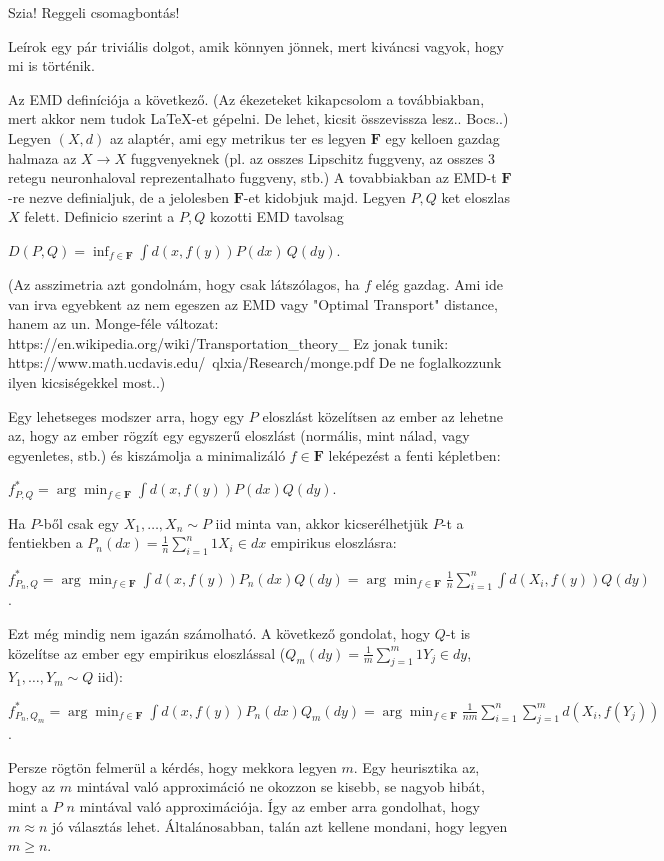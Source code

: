 \documentclass[a4paper]{article}
\newcommand{\cF}{\mathbf{F}}
\newcommand{\one}{1}
\begin{document}
Szia!
Reggeli csomagbontás!

Leírok egy pár triviális dolgot, amik könnyen jönnek, mert kiváncsi vagyok, hogy mi is történik.

Az EMD definíciója a következő. (Az ékezeteket kikapcsolom a továbbiakban, mert akkor nem tudok LaTeX-et gépelni. De lehet, kicsit összevissza lesz.. Bocs..)
Legyen $(X,d)$ az alaptér, ami egy metrikus ter es legyen $\cF$ egy kelloen gazdag halmaza az $X\to X$ fuggvenyeknek (pl. az osszes Lipschitz fuggveny, az osszes 3 retegu neuronhaloval reprezentalhato fuggveny, stb.)
A tovabbiakban az EMD-t $\cF$-re nezve definialjuk, de a jelolesben $\cF$-et kidobjuk majd.
Legyen $P,Q$ ket eloszlas $X$ felett. Definicio szerint a $P,Q$ kozotti EMD tavolsag

$D(P,Q) = \inf_{f\in \cF} \int d( x, f(y) ) P(dx) \,Q(dy)$.

(Az asszimetria azt gondolnám, hogy csak látszólagos, ha $f$ elég gazdag.
Ami ide van irva egyebkent az nem egeszen az EMD vagy "Optimal Transport" distance, hanem az un. Monge-féle változat:
https://en.wikipedia.org/wiki/Transportation\_theory\_%
Ez jonak tunik:
https://www.math.ucdavis.edu/~qlxia/Research/monge.pdf
De ne foglalkozzunk ilyen kicsiségekkel most..)

Egy lehetseges modszer arra, hogy egy $P$ eloszlást közelítsen az ember az lehetne az, hogy az ember rögzít egy egyszerű eloszlást (normális, mint nálad, vagy egyenletes, stb.) és kiszámolja a minimalizáló $f\in \cF$ leképezést a fenti képletben:

$f^*_{P,Q} = \arg\min_{f\in \cF} \int d(x,f(y)) P(dx) Q(dy)$.

Ha $P$-ből csak egy $X_1,\dots,X_n \sim P$ iid minta van, akkor kicserélhetjük $P$-t a fentiekben a $P_n(dx) = \frac1n \sum_{i=1}^n \one{X_i\in dx}$ empirikus eloszlásra:

$f^*_{P_n,Q} = \arg\min_{f\in \cF} \int d(x,f(y)) P_n(dx) Q(dy) = \arg\min_{f\in \cF} \frac1n \sum_{i=1}^n \int d(X_i,f(y)) Q(dy) $.

Ezt még mindig nem igazán számolható. A következő gondolat, hogy $Q$-t is közelítse az ember egy empirikus eloszlással ($Q_m(dy) = \frac1m \sum_{j=1}^m \one{Y_j\in dy}$, $Y_1,\dots,Y_m \sim Q$ iid):

$f^*_{P_n,Q_m} = \arg\min_{f\in \cF} \int d(x,f(y)) P_n(dx) Q_m(dy) = \arg\min_{f\in \cF} \frac1{nm} \sum_{i=1}^n \sum_{j=1}^m d(X_i,f(Y_j)) $.

Persze rögtön felmerül a kérdés, hogy mekkora legyen $m$. Egy heurisztika az, hogy az $m$ mintával való approximáció ne okozzon se kisebb, se nagyob hibát, mint a $P$ $n$ mintával való approximációja. Így az ember arra gondolhat, hogy $m \approx n$ jó választás lehet. Általánosabban, talán azt kellene mondani, hogy legyen $m \ge n$.
\end{document}
